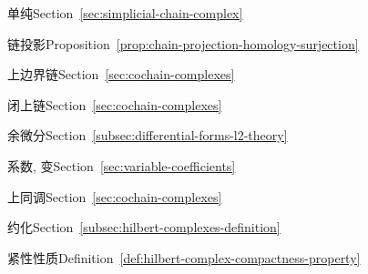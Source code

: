 \par\noindent\hspace*{1em}\label{index:chain-simplicial}{单纯}\quad Section~\ref{sec:simplicial-chain-complex}

\par\noindent\hspace*{0em}\label{index:chain-projection}{链投影}\quad Proposition~\ref{prop:chain-projection-homology-surjection}

\par\noindent\hspace*{0em}\label{index:coboundary}{上边界链}\quad Section~\ref{sec:cochain-complexes}

\par\noindent\hspace*{0em}\label{index:cocycle}{闭上链}\quad Section~\ref{sec:cochain-complexes}

\par\noindent\hspace*{0em}\label{index:codifferential}{余微分}\quad Section~\ref{subsec:differential-forms-l2-theory}

\par\noindent\hspace*{0em}\label{index:coefficients-variable}{系数, 变}\quad Section~\ref{sec:variable-coefficients}

\par\noindent\hspace*{0em}\label{index:cohomology}{上同调}\quad Section~\ref{sec:cochain-complexes}

\par\noindent\hspace*{1em}\label{index:cohomology-reduced}{约化}\quad Section~\ref{subsec:hilbert-complexes-definition}

\par\noindent\hspace*{0em}\label{index:compactness-property}{紧性性质}\quad Definition~\ref{def:hilbert-complex-compactness-property}

